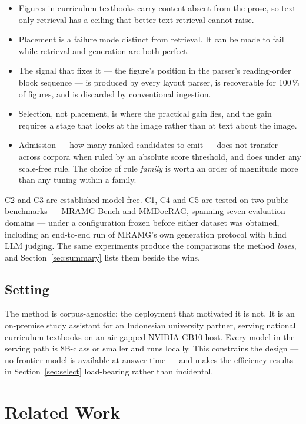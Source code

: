 \documentclass[journal]{IEEEtran}
\begin{document}
\begin{itemize}
\item[\textbf{C1}] Figures in curriculum textbooks carry content absent from the
prose, so text-only retrieval has a ceiling that better text retrieval cannot
raise.
\item[\textbf{C2}] Placement is a failure mode distinct from retrieval. It can be
made to fail while retrieval and generation are both perfect.
\item[\textbf{C3}] The signal that fixes it --- the figure's position in the
parser's reading-order block sequence --- is produced by every layout parser, is
recoverable for 100\,\% of figures, and is discarded by conventional ingestion.
\item[\textbf{C4}] Selection, not placement, is where the practical gain lies, and
the gain requires a stage that looks at the image rather than at text about the
image.
\item[\textbf{C5}] Admission --- how many ranked candidates to emit --- does not
transfer across corpora when ruled by an absolute score threshold, and does
under any scale-free rule. The choice of rule \emph{family} is worth an order
of magnitude more than any tuning within a family.
\end{itemize}

C2 and C3 are established model-free. C1, C4 and C5 are tested on two public
benchmarks --- MRAMG-Bench and MMDocRAG, spanning seven evaluation domains ---
under a configuration frozen before either dataset was obtained, including an
end-to-end run of MRAMG's own generation protocol with blind LLM judging. The
same experiments produce the comparisons the method \emph{loses}, and
Section~\ref{sec:summary} lists them beside the wins.

\subsection{Setting}

The method is corpus-agnostic; the deployment that motivated it is not. It is an
on-premise study assistant for an
Indonesian university partner, serving national curriculum textbooks on an
air-gapped NVIDIA GB10 host. Every model in the serving path is 8B-class or
smaller and runs locally. This constrains the design --- no frontier model is
available at answer time --- and makes the efficiency results in
Section~\ref{sec:select} load-bearing rather than incidental.

\section{Related Work}
\end{document}
